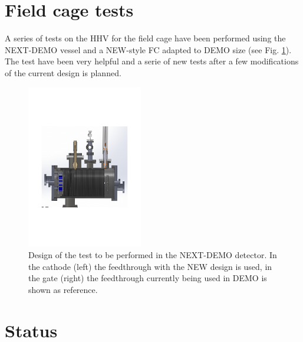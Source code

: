 


\section{Field cage tests}\label{sec:tests}

A series of tests on the HHV for the field cage have been performed using the NEXT-DEMO vessel and a NEW-style FC adapted to DEMO size (see Fig. \ref{fig:bufftest}). The test have been very helpful and a serie of new tests after a few modifications of the current design is  planned.

\begin{figure}[h!]
\centering
\includegraphics[width=0.45\textwidth]{img/demotest}
\caption{Design of the test to be performed in the NEXT-DEMO detector. In the cathode (left) the feedthrough with the NEW design is used, in the gate (right) the feedthrough currently being used in DEMO is shown as reference.} \label{fig:bufftest}
\end{figure}


\section{Status}

